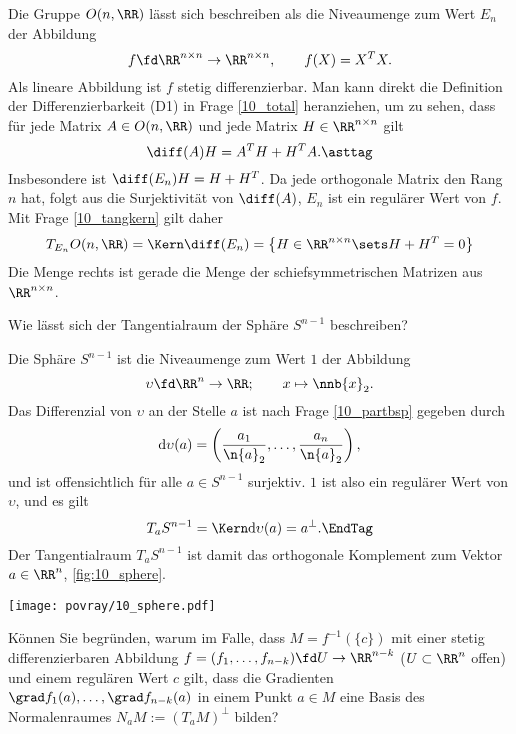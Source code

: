 \begin{antwort}
  Die Gruppe $O(n,\RR)$ lässt sich beschreiben als die Niveaumenge 
  zum Wert $E_n$ der Abbildung 
  \[
  f \fd \RR^{n\times n} \to \RR^{n\times n}, 
  \qquad 
  f(X) = X^T X.
  \]
  Als lineare Abbildung ist $f$ stetig differenzierbar. 
  Man kann direkt die Definition der Differenzierbarkeit 
  (D1) in Frage \ref{10_total} heranziehen, um zu sehen, dass 
  für jede Matrix $A\in O(n,\RR)$ und jede Matrix 
  $H \in \RR^{n\times n}$ gilt
  \begin{equation}
    \diff (A) H = A^T H + H^T A.
    \asttag
  \end{equation}
  Insbesondere ist $\diff( E_n) H = H+H^T$. 
  Da jede orthogonale Matrix den Rang $n$ hat, folgt aus {\astref} 
  die Surjektivität von $\diff(A)$, {\dasheisst} $E_n$ ist ein regulärer 
  Wert von $f$. 
  Mit Frage \ref{10_tangkern} gilt daher 
  \[
  T_{E_n} O(n,\RR) = \Kern \diff( E_n ) = \big\{ 
  H \in \RR^{n\times n} \sets H+H^T = 0 \big\} 
  \]
  Die Menge rechts ist gerade die Menge der schiefsymmetrischen 
  Matrizen aus $\RR^{n\times n}$. \AntEnd
\end{antwort} 

\begin{frage}
  Wie lässt sich der Tangentialraum der Sphäre $S^{n-1}$ beschreiben?
\end{frage}

\begin{antwort}
  \Ant Die Sphäre $S^{n-1}$ ist die Niveaumenge zum Wert $1$ der 
  Abbildung 
  \[
  \upsilon \fd \RR^n \to \RR; \qquad x \mapsto \nnb{x}_2.
  \]
  Das Differenzial von $\upsilon$ 
  an der Stelle $a$ ist nach Frage \ref{10_partbsp} gegeben durch
  \[
  \mathrm{d}\upsilon (a) = \left( \frac{a_1}{\n{a}_2}, \ldots, 
    \frac{a_n}{\n{a}_2} \right),
  \]
  und ist offensichtlich für alle $a\in S^{n-1}$ surjektiv. $1$ ist also 
  ein regulärer Wert von $\upsilon$, und es gilt 
  \[
  T_a S^{n-1} = \Kern \mathrm{d}\upsilon (a) = a^{\perp}. \EndTag
  \]
  Der Tangentialraum $T_a S^{n-1}$ ist damit das orthogonale Komplement zum Vektor $a\in \RR^n$, 
  \sieheAbbildung\ref{fig:10_sphere}.
  \begin{center}
    \texttt{[image: povray/10\_sphere.pdf]}
    \label{fig:10_sphere}
  \end{center}
\end{antwort} 

\begin{frage}\label{10_normalenraum}
  Können Sie begründen, warum im Falle, dass $M=f^{-1}( \{ c \} )$ 
  mit einer stetig differenzierbaren Abbildung 
  $f=(f_1,\ldots,f_{n-k}) \fd U\to \RR^{n-k}$ ($U\subset\RR^n$ offen) 
  und einem regulären Wert $c$ gilt, 
  dass die Gradienten $\grad f_1(a), \ldots, \grad f_{n-k} (a)$ in einem 
  Punkt $a\in M$ eine Basis des Normalenraumes $N_aM := (T_aM)^{\perp}$ bilden?
\end{frage}

